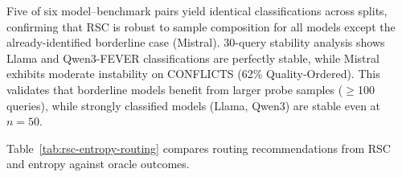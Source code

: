 \documentclass[11pt]{article}
\theoremstyle{definition}
\begin{document}
\begin{table}[t]
\centering
{}
\caption{\textbf{RSC stability across split-half and 30-query subsets.} Split-half compares the first vs.\ last 50 queries. The 30-query columns show the percentage of 100 random 30-query subsets yielding each classification. Bold numbers indicate the classification that matches the full 100-query ground truth.}
\label{tab:split-half}
\end{table}

\noindent Five of six model--benchmark pairs yield identical classifications
across splits, confirming that RSC is robust to sample composition
for all models except the already-identified borderline case
(Mistral). 30-query stability analysis shows Llama and Qwen3-FEVER classifications are perfectly stable, while Mistral exhibits moderate instability on CONFLICTS (62\% Quality-Ordered). This validates that borderline models benefit from larger probe samples (\(\geq\)100 queries), while strongly classified
models (Llama, Qwen3) are stable even at \(n{=}50\).


Table~\ref{tab:rsc-entropy-routing} compares routing recommendations from RSC and entropy against oracle outcomes.
\end{document}
